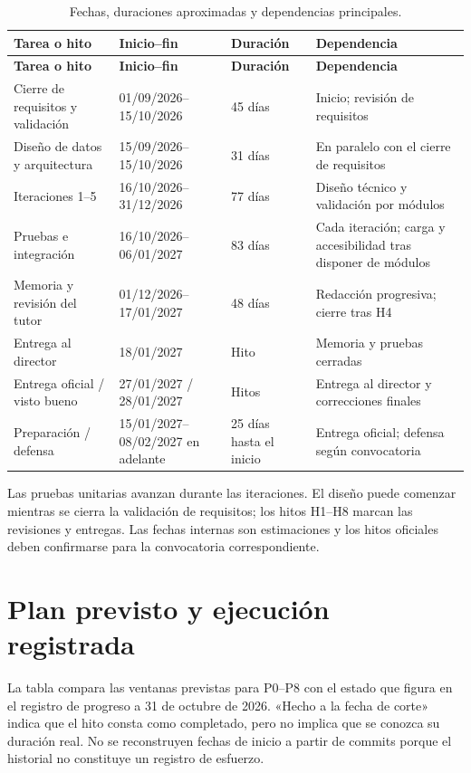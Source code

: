 \begin{longtable}{|p{}|p{}|p{}|p{}|}
\caption{Fechas, duraciones aproximadas y dependencias principales.}\label{tab:fechas-gantt}\\
\hline
\textbf{Tarea o hito} & \textbf{Inicio--fin} & \textbf{Duración} & \textbf{Dependencia} \\
\hline
\endfirsthead
\hline
\textbf{Tarea o hito} & \textbf{Inicio--fin} & \textbf{Duración} & \textbf{Dependencia} \\
\hline
\endhead
\hline
\endfoot
\hline
\endlastfoot
Cierre de requisitos y validación & 01/09/2026--15/10/2026 & 45 días & Inicio; revisión de requisitos \\
\hline
Diseño de datos y arquitectura & 15/09/2026--15/10/2026 & 31 días & En paralelo con el cierre de requisitos \\
\hline
Iteraciones 1--5 & 16/10/2026--31/12/2026 & 77 días & Diseño técnico y validación por módulos \\
\hline
Pruebas e integración & 16/10/2026--06/01/2027 & 83 días & Cada iteración; carga y accesibilidad tras disponer de módulos \\
\hline
Memoria y revisión del tutor & 01/12/2026--17/01/2027 & 48 días & Redacción progresiva; cierre tras H4 \\
\hline
Entrega al director & 18/01/2027 & Hito & Memoria y pruebas cerradas \\
\hline
Entrega oficial / visto bueno & 27/01/2027 / 28/01/2027 & Hitos & Entrega al director y correcciones finales \\
\hline
Preparación / defensa & 15/01/2027--08/02/2027 en adelante & 25 días hasta el inicio & Entrega oficial; defensa según convocatoria \\
\hline
\end{longtable}

Las pruebas unitarias avanzan durante las iteraciones. El diseño puede
comenzar mientras se cierra la validación de requisitos; los hitos H1--H8
marcan las revisiones y entregas. Las fechas internas son estimaciones y los
hitos oficiales deben confirmarse para la convocatoria correspondiente.

\section{Plan previsto y ejecución registrada}
\label{sec:plan-previsto-real}

La tabla compara las ventanas previstas para P0--P8 con el estado que figura
en el registro de progreso a 31 de octubre de 2026. «Hecho a la fecha de
corte» indica que el hito consta como completado, pero no implica que se
conozca su duración real. No se reconstruyen fechas de inicio a partir de
commits porque el historial no constituye un registro de esfuerzo.

